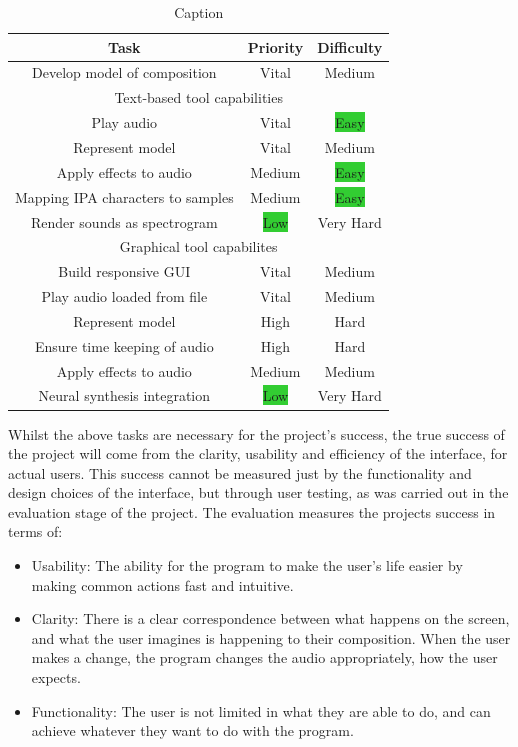 \documentclass[12pt,a4paper,twoside,openright]{report}
\newcommand{\vital}{\colorbox{BrickRed}{Vital}}
\newcommand{\veryhard}{\colorbox{BrickRed}{Very Hard}}
\newcommand{\hard}{\colorbox{RedOrange}{Hard}}
\newcommand{\high}{\colorbox{RedOrange}{High}}
\newcommand{\medium}{\colorbox{Dandelion}{Medium}}
\newcommand{\low}{\colorbox{LimeGreen}{Low}}
\newcommand{\easy}{\colorbox{LimeGreen}{Easy}}
\begin{document}
\begin{table}[h]
    \centering
    \begin{tabular}{|c|c|c|}
        \hline
         Task & Priority & Difficulty \\
         \hline
         Develop model of composition & \vital & \medium \\
         \hline
         \multicolumn{3}{|c|}{Text-based tool capabilities} \\
         \hline
         Play audio & \vital & \easy \\
         Represent model & \vital & \medium \\
         Apply effects to audio & \medium & \easy \\
         Mapping IPA characters to samples & \medium & \easy \\
         Render sounds as spectrogram & \low & \veryhard \\
         \hline
         \multicolumn{3}{|c|}{Graphical tool capabilites} \\
         \hline
         Build responsive GUI & \vital & \medium \\
         Play audio loaded from file & \vital & \medium \\
         Represent model & \high & \hard \\
         Ensure time keeping of audio & \high & \hard \\
         Apply effects to audio & \medium & \medium \\
         Neural synthesis integration & \low & \veryhard \\
         \hline
    \end{tabular}
    \caption{Caption}
    \label{tab:req_anal}
\end{table}

Whilst the above tasks are necessary for the project's success, the true success of the project will come from the clarity, usability and efficiency of the interface, for actual users. This success cannot be measured just by the functionality and design choices of the interface, but through user testing, as was carried out in the evaluation stage of the project.  The evaluation measures the projects success in terms of:
\begin{itemize}
    \item Usability: The ability for the program to make the user's life easier by making common actions fast and intuitive.
    \item Clarity: There is a clear correspondence between what happens on the screen, and what the user imagines is happening to their composition. When the user makes a change, the program changes the audio appropriately, how the user expects.
    \item Functionality: The user is not limited in what they are able to do, and can achieve whatever they want to do with the program.
\end{itemize}
\end{document}
